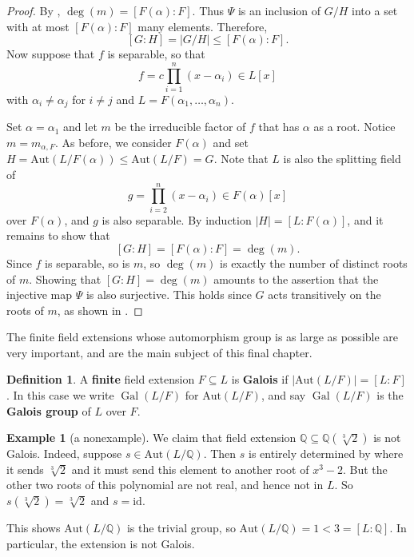 \documentclass[12pt]{report}
\numberwithin{equation}{section}
\numberwithin{theorem}{chapter}
\theoremstyle{definition}
\newtheorem{definition}[theorem]{Definition}
\newtheorem{example}[theorem]{Example}
\newtheorem*{basic properties}{Basic Properties}
\newtheorem*{Important Remark}{Important Remark}
\newcommand{\df}[1]{{\bf #1}\index{#1}}
\DeclareMathOperator{\Gal}{Gal}
\begin{document}
\begin{proof}
By , $\deg(m) = [F(\alpha): F]$. Thus $\Psi$ is an inclusion of $G/H$ into a set with at most $[F(\alpha): F]$ many elements. Therefore, 
$$[G:H] = |G/H| \leqslant [F(\alpha): F].$$
Now suppose that $f$ is separable, so that 
$$f = c \prod_{i=1}^n (x-\alpha_i) \in L[x]$$ 
with $\alpha_i \neq \alpha_j$ for $i \neq j$ and $L = F(\alpha_1, \dots, \alpha_n)$.

Set $\alpha = \alpha_1$ and let $m$ be the irreducible factor of $f$ that has $\alpha$ as a root. Notice $m=m_{\alpha,F}$. As before, we consider $F(\alpha)$ and set $H = \mathrm{Aut}(L/F(\alpha)) \leq \mathrm{Aut}(L/F) = G$. Note that $L$ is also the splitting field of 
$$g = \prod_{i=2}^n (x - \alpha_i) \in F(\alpha)[x]$$
over $F(\alpha)$, and $g$ is also separable. By induction $|H| = [L:F(\alpha)]$, and it remains to show that 
$$[G:H] = [F(\alpha):F] = \deg(m).$$ 
Since $f$ is separable, so is $m$, so $\deg(m)$ is exactly the number of distinct roots of $m$. Showing that $[G:H] =\deg(m)$ amounts to the assertion that the injective map $\Psi$ is also surjective. This holds since $G$ acts transitively on the roots of $m$, as shown in .
\end{proof}




The finite field extensions whose automorphism group is as large as possible are very important, and are the main subject of this final chapter.
 

\begin{definition}\index{$\Gal(L/F)$}
A {\bf finite} field extension $F \subseteq L$ is {\bf Galois} if $|\mathrm{Aut}(L/F) |= [L:F]$. In this case we write $\Gal(L/F)$ for $\mathrm{Aut}(L/F)$, and say $\Gal(L/F)$ is the \df{Galois group} of $L$ over $F$.
\end{definition}



\begin{example}[a nonexample]\label{non Galois example}
We claim that field extension $\mathbb{Q} \subseteq \mathbb{Q}(\sqrt[3]{2})$ is not Galois. Indeed, suppose $s \in \mathrm{Aut}(L/\mathbb{Q})$. Then $s$ is entirely determined by where it sends $\sqrt[3]{2}$ and it must send this element to another root of $x^3 - 2$. But the other two roots of this polynomial are not real, and hence not in $L$. So $s(\sqrt[3]{2}) = \sqrt[3]{2}$ and $s = \mathrm{id}$.

This shows $\mathrm{Aut}(L/\mathbb{Q})$ is the trivial group, so $\mathrm{Aut}(L/\mathbb{Q}) = 1 < 3 = [L:\mathbb{Q}]$. In particular, the extension is not Galois.
\end{example}
\end{document}
